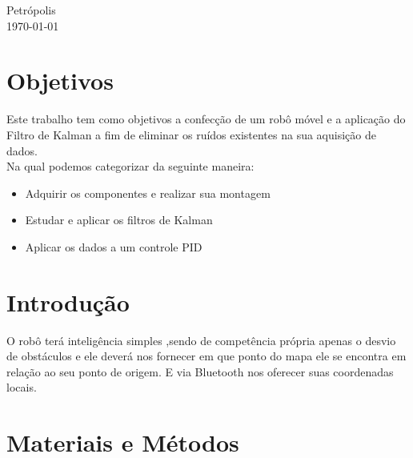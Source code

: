 \documentclass[11pt]{article}
\begin{document}
\begin{titlepage}
	
	\vfill\vfill\vfill %
	Petrópolis\\
	{\large\today} %
	
	
	 
	
	\vfill %
	
\end{titlepage}
\newpage

\newpage
\section{Objetivos}
Este trabalho tem como objetivos a confecção de um robô móvel e a aplicação do Filtro de Kalman a fim de eliminar os ruídos existentes na sua aquisição de dados. \\

Na qual podemos categorizar da seguinte maneira:
\begin{itemize}
\item Adquirir os componentes e realizar sua montagem
\item Estudar e aplicar os filtros de Kalman
\item Aplicar os dados a um controle PID
\end{itemize}
\section{Introdução}
O robô terá inteligência simples ,sendo de competência  própria apenas o desvio de obstáculos e ele deverá nos fornecer em que ponto do mapa ele se encontra em relação ao seu ponto de origem. E via Bluetooth nos oferecer suas coordenadas locais.
\section{Materiais e Métodos }
\end{document}
